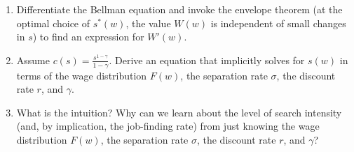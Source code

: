 \documentclass[11pt]{article}
\newcommand{\ben}{\begin{enumerate}}
\newcommand{\een}{\end{enumerate}}
\begin{document}
\ben
	\item Differentiate the Bellman equation and invoke the envelope theorem (at the optimal choice of $s^*(w)$, the value $W(w)$ is independent of small changes in $s$) to find an expression for $W'(w)$.
	
	\item Assume $c(s) = \frac{s^{1-\gamma} }{1-\gamma}$. Derive an equation that implicitly solves for $s(w)$ in terms of the wage distribution $F(w)$, the separation rate $\sigma$, the discount rate $r$, and $\gamma$.
	
	\item What is the intuition? Why can we learn about the level of search intensity (and, by implication, the job-finding rate) from just knowing the wage distribution $F(w)$, the separation rate $\sigma$, the discount rate $r$, and $\gamma$?
\een

 
\end{document}
